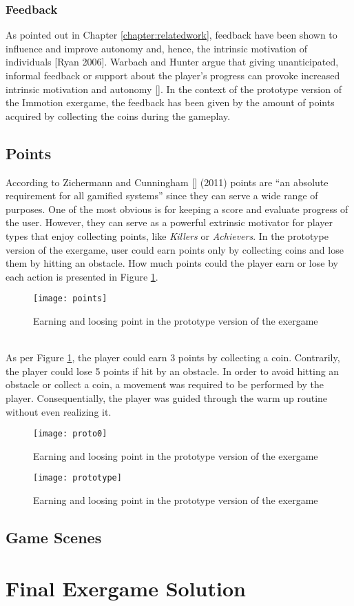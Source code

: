 \subsubsection{Feedback}
As pointed out in Chapter \ref{chapter:relatedwork}, feedback have been shown to influence and improve autonomy and, hence, the intrinsic motivation of individuals [Ryan 2006]. Warbach and Hunter argue that giving unanticipated, informal feedback or support about the player's progress can provoke increased intrinsic motivation and autonomy []. In the context of the prototype version of the Immotion exergame, the feedback has been given by the amount of points acquired by collecting the coins during the gameplay.
\subsection{Points}
According to Zichermann and Cunningham [] (2011) points are ``an absolute requirement for all gamified systems'' since they can serve a wide range of purposes. One of the most obvious is for keeping a score and evaluate progress of the user. However, they can serve as a powerful extrinsic motivator for player types that enjoy collecting points, like \textit{Killers} or \textit{Achievers}. In the prototype version of the exergame, user could earn points only by collecting coins and lose them by hitting an obstacle. How much points could the player earn or lose by each action is presented in Figure \ref{fig:points}.
\begin{figure}[h]
    \centering
    \texttt{[image: points]}
    \caption{Earning and loosing point in the prototype version of the exergame}
    \label{fig:points}
\end{figure}\\
As per Figure \ref{fig:points}, the player could earn 3 points by collecting a coin. Contrarily, the player could lose 5 points if hit by an obstacle. In order to avoid hitting an obstacle or collect a coin, a movement was required to be performed by the player. Consequentially, the player was guided through the warm up routine without even realizing it.
\begin{figure}[h]
    \centering
    \texttt{[image: proto0]}
    \caption{Earning and loosing point in the prototype version of the exergame}
    \label{fig:prototype_usage}
\end{figure}
\begin{figure}[h]
    \centering
    \texttt{[image: prototype]}
    \caption{Earning and loosing point in the prototype version of the exergame}
    \label{fig:prototype}
\end{figure}
\subsection{Game Scenes}
\section{Final Exergame Solution}